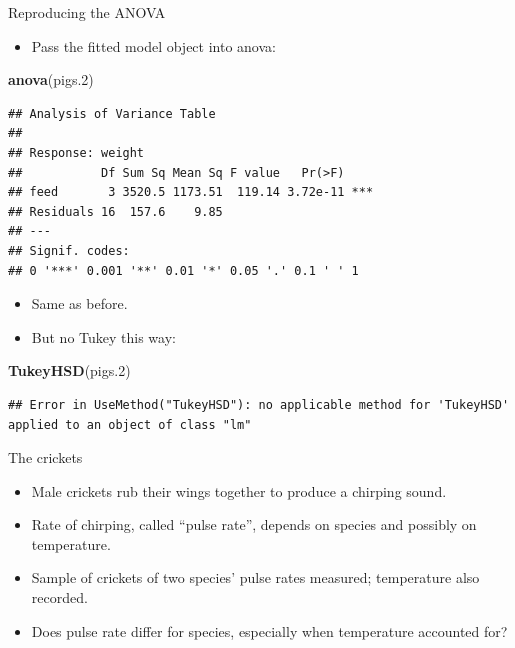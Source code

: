\documentclass[ignorenonframetext,]{beamer}
\newenvironment{Shaded}{\begin{snugshade}}{\end{snugshade}}
\newcommand{\FloatTok}[1]{\textcolor[rgb]{0.00,0.00,0.81}{#1}}
\newcommand{\KeywordTok}[1]{\textcolor[rgb]{0.13,0.29,0.53}{\textbf{#1}}}
\newcommand{\NormalTok}[1]{#1}
\providecommand{\tightlist}{%
  \setlength{\itemsep}{0pt}\setlength{\parskip}{0pt}}
\begin{document}
\begin{frame}[fragile]{Reproducing the ANOVA}
\protect\hypertarget{reproducing-the-anova}{}

\begin{itemize}
\tightlist
\item
  Pass the fitted model object into anova:
\end{itemize}

\begin{Shaded}
\begin{Highlighting}[]
\KeywordTok{anova}\NormalTok{(pigs}\FloatTok{.2}\NormalTok{)}
\end{Highlighting}
\end{Shaded}

\begin{verbatim}
## Analysis of Variance Table
## 
## Response: weight
##           Df Sum Sq Mean Sq F value   Pr(>F)    
## feed       3 3520.5 1173.51  119.14 3.72e-11 ***
## Residuals 16  157.6    9.85                     
## ---
## Signif. codes:  
## 0 '***' 0.001 '**' 0.01 '*' 0.05 '.' 0.1 ' ' 1
\end{verbatim}

\begin{itemize}
\tightlist
\item
  Same as before.
\item
  But no Tukey this way:
\end{itemize}

\begin{Shaded}
\begin{Highlighting}[]
\KeywordTok{TukeyHSD}\NormalTok{(pigs}\FloatTok{.2}\NormalTok{)}
\end{Highlighting}
\end{Shaded}

\begin{verbatim}
## Error in UseMethod("TukeyHSD"): no applicable method for 'TukeyHSD' applied to an object of class "lm"
\end{verbatim}

\end{frame}

\begin{frame}{The crickets}
\protect\hypertarget{the-crickets}{}

\begin{itemize}
\tightlist
\item
  Male crickets rub their wings together to produce a chirping sound.
\item
  Rate of chirping, called ``pulse rate'', depends on species and
  possibly on temperature.
\item
  Sample of crickets of two species' pulse rates measured; temperature
  also recorded.
\item
  Does pulse rate differ for species, especially when temperature
  accounted for?
\end{itemize}

\end{frame}
\end{document}
